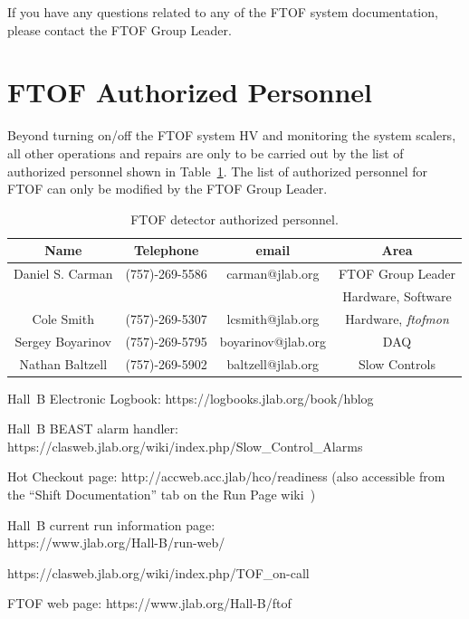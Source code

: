 \documentclass[12pt]{article}
\begin{document}
If you have any questions related to any of the FTOF system documentation, please 
contact the FTOF Group Leader.

\section{FTOF Authorized Personnel}
\label{personnel}

Beyond turning on/off the FTOF system HV and monitoring the system scalers, all other 
operations and repairs are only to be carried out by the list of authorized personnel 
shown in Table~\ref{expert-list}. The list of authorized personnel for FTOF can only 
be modified by the FTOF Group Leader.

\begin{table}[htbp]
\begin{center}
\begin{tabular} {|c|c|c|c|} \hline
Name             & Telephone      & email              & Area             \\ \hline \hline
Daniel S. Carman & (757)-269-5586 & carman@jlab.org    & FTOF Group Leader\\
                 &                &                    & Hardware, Software \\ \hline
Cole Smith       & (757)-269-5307 & lcsmith@jlab.org   & Hardware, {\it ftofmon} \\ \hline
Sergey Boyarinov & (757)-269-5795 & boyarinov@jlab.org & DAQ              \\ \hline
Nathan Baltzell  & (757)-269-5902 & baltzell@jlab.org  & Slow Controls    \\ \hline
\end{tabular}
\caption{FTOF detector authorized personnel.}
\label{expert-list}
\end{center}
\end{table}

\clearpage

\vfil
\eject

\begin{thebibliography}{99}

Hall~B Electronic Logbook: https://logbooks.jlab.org/book/hblog

Hall~B BEAST alarm handler: \\
https://clasweb.jlab.org/wiki/index.php/Slow\_Control\_Alarms

Hot Checkout page: http://accweb.acc.jlab/hco/readiness (also accessible from the
``Shift Documentation'' tab on the Run Page wiki~\cite{run-page})

Hall~B current run information page:\\
https://www.jlab.org/Hall-B/run-web/

https://clasweb.jlab.org/wiki/index.php/TOF\_on-call

FTOF web page: https://www.jlab.org/Hall-B/ftof

\end{thebibliography}
\end{document}
